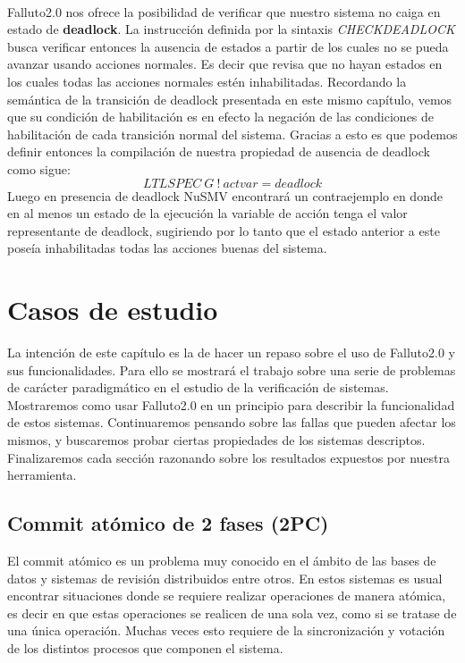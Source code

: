 \documentclass[titlepage, 12pt]{book}
\begin{document}
~\\

Falluto2.0 nos ofrece la posibilidad de verificar que nuestro sistema no caiga en estado de \textbf{deadlock}. La instrucci\'on definida por la sintaxis \textit{CHECKDEADLOCK} busca verificar entonces la ausencia de estados a partir de los cuales no se pueda avanzar usando acciones normales. Es decir que revisa que no hayan estados en los cuales todas las acciones normales est\'en inhabilitadas. Recordando la sem\'antica de la transici\'on de deadlock presentada en este mismo cap\'itulo, vemos que su condici\'on de habilitaci\'on es en efecto la negaci\'on de las condiciones de habilitaci\'on de cada transici\'on normal del sistema. Gracias a esto es que podemos definir entonces la compilaci\'on de nuestra propiedad de ausencia de deadlock como sigue:
$$LTLSPEC~G~!~actvar = deadlock$$
Luego en presencia de deadlock NuSMV encontrar\'a un contraejemplo en donde en al menos un estado de la ejecuci\'on la variable de acci\'on tenga el valor representante de deadlock, sugiriendo por lo tanto que el estado anterior a este pose\'ia inhabilitadas todas las acciones buenas del sistema.





\chapter{Casos de estudio}

La intenci\'on de este cap\'itulo es la de hacer un repaso sobre el uso de Falluto2.0 y sus funcionalidades. Para ello se mostrar\'a el trabajo sobre una serie de problemas de car\'acter paradigm\'atico en el estudio de la verificaci\'on de sistemas. Mostraremos como usar Falluto2.0 en un principio para describir la funcionalidad de estos sistemas. Continuaremos pensando sobre las fallas que pueden afectar los mismos, y buscaremos probar ciertas propiedades de los sistemas descriptos. Finalizaremos cada secci\'on razonando sobre los resultados expuestos por nuestra herramienta.

\section{Commit at\'omico de 2 fases (2PC)}

El commit at\'omico es un problema muy conocido en el \'ambito de las bases de datos y sistemas de revisi\'on distribuidos entre otros. En estos sistemas es usual encontrar situaciones donde se requiere realizar operaciones de manera at\'omica, es decir en que estas operaciones se realicen de una sola vez, como si se tratase de una \'unica operaci\'on. Muchas veces esto requiere de la sincronizaci\'on y votaci\'on de los distintos procesos que componen el sistema.\\
\end{document}
